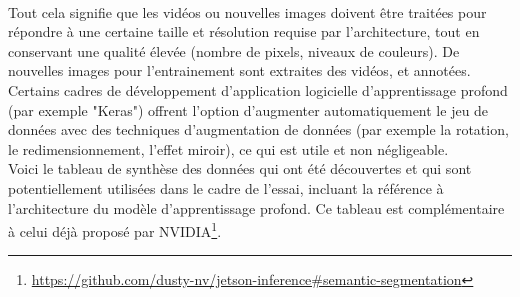 \vspace{0.5\baselineskip}
\\
\noindent Tout cela signifie que les vidéos ou nouvelles images doivent être traitées pour répondre à une certaine taille et résolution requise par l'architecture, tout en conservant une qualité élevée (nombre de pixels, niveaux de couleurs). De nouvelles images pour l'entrainement sont extraites des vidéos, et annotées. 
\vspace{0.5\baselineskip}
\\
\noindent Certains cadres de développement d'application logicielle d'apprentissage profond (par exemple "Keras") offrent l'option d'augmenter automatiquement le jeu de données avec des techniques d'augmentation de données (par exemple la rotation, le redimensionnement, l'effet miroir), ce qui est utile et non négligeable.
\vspace{0.5\baselineskip}
\\
\noindent Voici le tableau de synthèse des données qui ont été découvertes et qui sont potentiellement utilisées dans le cadre de l'essai, incluant la référence à l'architecture du modèle d'apprentissage profond. Ce tableau est complémentaire à celui déjà proposé par NVIDIA\footnote{\url{https://github.com/dusty-nv/jetson-inference#semantic-segmentation}}.
